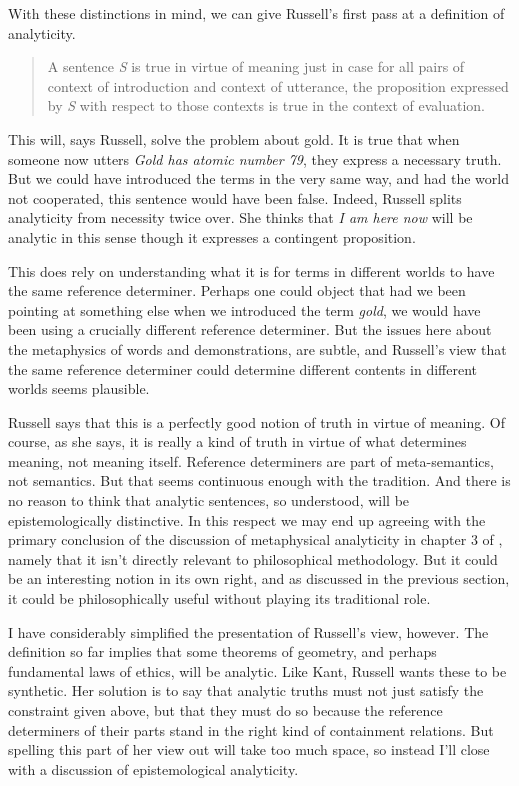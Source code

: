 With these distinctions in mind, we can give Russell's first pass at a definition of analyticity.

\begin{quote}
A sentence \textit{S} is true in virtue of meaning just in case for all pairs of context of introduction and context of utterance, the proposition expressed by \textit{S} with respect to those contexts is true in the context of evaluation. \citep[56]{Russell2008}
\end{quote}
This will, says Russell, solve the problem about gold. It is true that when someone now utters \emph{Gold has atomic number 79}, they express a necessary truth. But we could have introduced the terms in the very same way, and had the world not cooperated, this sentence would have been false. Indeed, Russell splits analyticity from necessity twice over. She thinks that \emph{I am here now} will be analytic in this sense though it expresses a contingent proposition.

This does rely on understanding what it is for terms in different worlds to have the same reference determiner. Perhaps one could object that had we been pointing at something else when we introduced the term \emph{gold}, we would have been using a crucially different reference determiner. But the issues here about the metaphysics of words and demonstrations, are subtle, and Russell's view that the same reference determiner could determine different contents in different worlds seems plausible.

Russell says that this is a perfectly good notion of truth in virtue of meaning. Of course, as she says, it is really a kind of truth in virtue of what determines meaning, not meaning itself. Reference determiners are part of meta-semantics, not semantics. But that seems continuous enough with the tradition. And there is no reason to think that analytic sentences, so understood, will be epistemologically distinctive. In this respect we may end up agreeing with the primary conclusion of the discussion of metaphysical analyticity in chapter 3 of  \citet{Williamson2007-WILTPO-17}, namely that it isn't directly relevant to philosophical methodology. But it could be an interesting notion in its own right, and as discussed in the previous section, it could be philosophically useful without playing its traditional role.

I have considerably simplified the presentation of Russell's view, however. The definition so far implies that some theorems of geometry, and perhaps fundamental laws of ethics, will be analytic. Like Kant, Russell wants these to be synthetic. Her solution is to say that analytic truths must not just satisfy the constraint given above, but that they must do so because the reference determiners of their parts stand in the right kind of containment relations. But spelling this part of her view out will take too much space, so instead I'll close with a discussion of epistemological analyticity.

